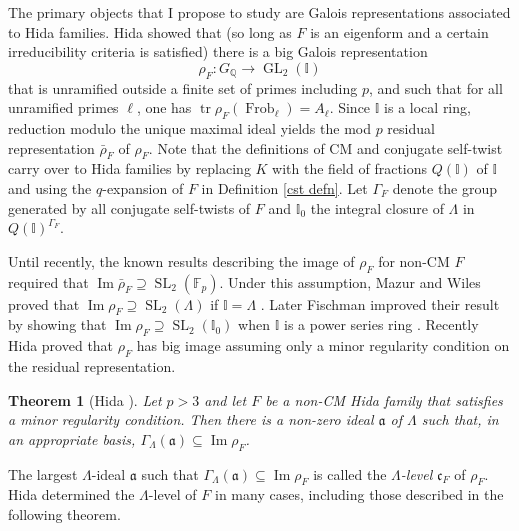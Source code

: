 \documentclass[11pt]{amsart}
\newtheorem{thm}{Theorem}[section]
\theoremstyle{definition}
\theoremstyle{remark}
\DeclareMathOperator{\Frob}{Frob}
\DeclareMathOperator{\tr}{tr}
\def\Aa{\mathfrak{a}}
\def\cc{\mathfrak{c}}
\def\F{\mathbb{F}}
\def\I{\mathbb{I}}
\def\Q{\mathbb{Q}}
\DeclareMathOperator{\GL}{GL}
\DeclareMathOperator{\im}{Im}
\DeclareMathOperator{\SL}{SL}
\begin{document}
The primary objects that I propose to study are Galois representations associated to Hida families.  Hida showed \cite{Hida86b} that (so long as $F$ is an eigenform and a certain irreducibility criteria is satisfied) there is a big Galois representation 
\[
\rho_F : G_\Q \to \GL_2(\I)
\] 
that is unramified outside a finite set of primes including $p$, and such that for all unramified primes $\ell$, one has $\tr \rho_F(\Frob_\ell) = A_\ell$.  Since $\I$ is a local ring, reduction modulo the unique maximal ideal yields the mod $p$ residual representation $\bar{\rho}_F$ of $\rho_F$.  Note that the definitions of CM and conjugate self-twist carry over to Hida families by replacing $K$ with the field of fractions $Q(\I)$ of $\I$ and using the $q$-expansion of $F$ in Definition \ref{cst defn}.  Let $\Gamma_F$ denote the group generated by all conjugate self-twists of $F$ and $\I_0$ the integral closure of $\Lambda$ in $Q(\I)^{\Gamma_F}$.  

Until recently, the known results describing the image of $\rho_F$ for non-CM $F$ required that $\im \bar{\rho}_F \supseteq \SL_2(\F_p)$.  Under this assumption, Mazur and Wiles proved that $\im \rho_F \supseteq \SL_2(\Lambda)$ if $\I = \Lambda$ \cite{MazurWiles86}.  Later Fischman improved their result by showing that $\im \rho_F \supseteq \SL_2(\I_0)$ when $\I$ is a power series ring \cite{Fischman02}.  Recently Hida proved that $\rho_F$ has big image assuming only a minor regularity condition on the residual representation.

\begin{thm}[Hida \cite{Hida15}]\label{HidaI}
Let $p > 3$ and let $F$ be a non-CM Hida family that satisfies a minor regularity condition.  Then there is a non-zero ideal $\Aa$ of $\Lambda$ such that, in an appropriate basis, $\Gamma_\Lambda(\Aa) \subseteq \im \rho_F$.  
\end{thm}

The largest $\Lambda$-ideal $\Aa$ such that $\Gamma_\Lambda(\Aa) \subseteq \im \rho_F$ is called the \textit{$\Lambda$-level} $\cc_F$ of $\rho_F$.  Hida determined the $\Lambda$-level of $F$ in many cases, including those described in the following theorem.
\end{document}
